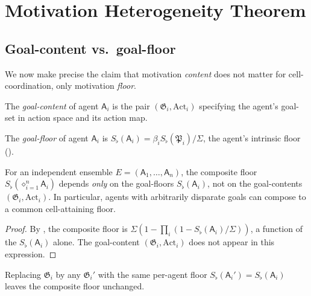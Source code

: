 \documentclass[11pt,a4paper]{article}
\newcommand{\Method}{\mathfrak{P}}
\newcommand{\Goal}{\mathfrak{G}}
\newcommand{\agent}{\mathsf{A}}
\newcommand{\Sfloor}{S_{\flat}}
\newcommand{\Action}{\mathrm{Act}}
\newcommand{\Compose}{\diamond}
\begin{document}
\section{Motivation Heterogeneity Theorem}
\label{sec:motivation}

\subsection{Goal-content vs.\ goal-floor}

We now make precise the claim that motivation \emph{content} does not
matter for cell-coordination, only motivation \emph{floor}.

\begin{definition}\label{def:goal-content}
The \emph{goal-content} of agent $\agent_i$ is the pair
$(\Goal_i,\Action_i)$ specifying the agent's goal-set in action space
and its action map.
\end{definition}

\begin{definition}\label{def:goal-floor}
The \emph{goal-floor} of agent $\agent_i$ is
$\Sfloor(\agent_i)=\beta_i\Sfloor(\Method_i)/\Sigma$,
the agent's intrinsic floor ().
\end{definition}

\begin{theorem}\label{thm:mot-het}
For an independent ensemble $E=(\agent_1,\dots,\agent_n)$, the
composite floor $\Sfloor(\Compose_{i=1}^n\agent_i)$ depends \emph{only}
on the goal-floors $\Sfloor(\agent_i)$, not on the goal-contents
$(\Goal_i,\Action_i)$. In particular, agents with arbitrarily disparate
goals can compose to a common cell-attaining floor.
\end{theorem}

\begin{proof}
By , the composite floor is
$\Sigma(1-\prod_i(1-\Sfloor(\agent_i)/\Sigma))$, a function of the
$\Sfloor(\agent_i)$ alone. The goal-content $(\Goal_i,\Action_i)$
does not appear in this expression.
\end{proof}

\begin{corollary}\label{cor:goal-sub}
Replacing $\Goal_i$ by any $\Goal_i'$ with the same per-agent floor
$\Sfloor(\agent_i')=\Sfloor(\agent_i)$ leaves the composite floor
unchanged.
\end{corollary}
\end{document}
